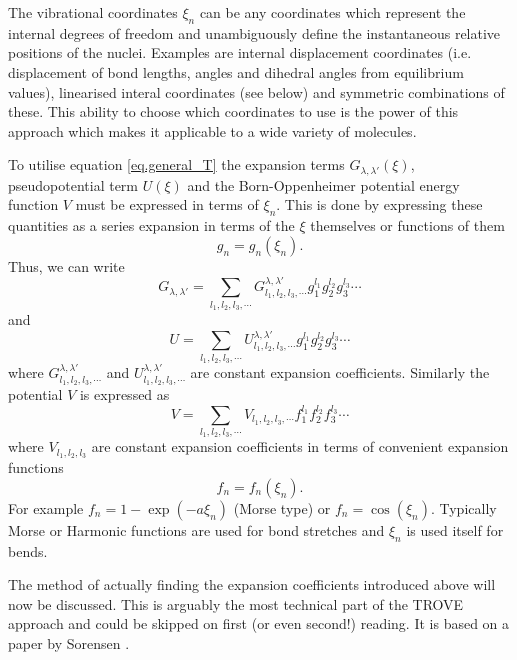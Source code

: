 The vibrational coordinates $\xi_n$ can be any coordinates which represent the internal degrees of freedom and 
unambiguously define the instantaneous relative positions of the nuclei. Examples are internal displacement coordinates 
(i.e. displacement of bond lengths, angles and dihedral angles from equilibrium values), linearised interal coordinates
(see below) and symmetric combinations of these. This ability to choose which coordinates to use is the power of this approach
which makes it applicable to a wide variety of molecules. 

To utilise equation \ref{eq.general_T} the expansion terms $G_{\lambda,\lambda'}(\xi)$, pseudopotential term $U(\xi)$ and
the Born-Oppenheimer potential energy function $V$ must be expressed in terms of $\xi_n$. This is done by expressing these
quantities as a series expansion in terms of the $\xi$ themselves or functions of them
\begin{equation}
\label{eq.func_of_xi}
g_n = g_n(\xi_n).
\end{equation}
Thus, we can write
\begin{equation}
\label{eq.G_expansion}
G_{\lambda,\lambda'} = \sum_{l_1,l_2,l_3,\cdots} G_{l_1,l_2,l_3,\cdots}^{\lambda,\lambda'} g_1^{l_1} g_2^{l_2} g_3^{l_3} \cdots 
\end{equation}
and 
\begin{equation}
\label{eq.U_expansion}
U = \sum_{l_1,l_2,l_3,\cdots} U_{l_1,l_2,l_3,\cdots}^{\lambda,\lambda'} g_1^{l_1} g_2^{l_2} g_3^{l_3} \cdots 
\end{equation}
where $G_{l_1,l_2,l_3,\cdots}^{\lambda,\lambda'}$ and $U_{l_1,l_2,l_3,\cdots}^{\lambda,\lambda'}$ are constant expansion
coefficients. Similarly the potential $V$ is expressed as
\begin{equation}
\label{eq.V_expansion}
V = \sum_{l_1,l_2,l_3,\cdots} V_{l_1,l_2,l_3,\cdots} f_1^{l_1} f_2^{l_2} f_3^{l_3} \cdots
\end{equation}
where $V_{l_1,l_2,l_3}$ are constant expansion coefficients in terms of convenient expansion functions
\begin{equation}
\label{eq.v_exp_func}
f_n = f_n(\xi_n).
\end{equation}
For example $f_n = 1 - \exp(-a \xi_n)$ (Morse type) or $f_n = \cos(\xi_n)$. Typically Morse or Harmonic functions are used 
for bond stretches and $\xi_n$ is used itself for bends. 

The method of actually finding the expansion coefficients introduced above will now be discussed. This is arguably the most
technical part of the TROVE approach and could be skipped on first (or even second!) reading. It is based on a paper by
Sorensen \cite{79Soxxxx.method}.

